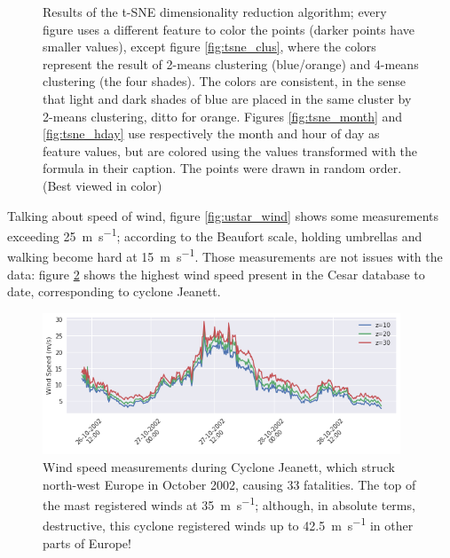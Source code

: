\documentclass[a4paper]{book}
\begin{document}
\begin{figure}
    \caption{Results of the t-SNE dimensionality reduction algorithm; every figure uses a different feature to color the points (darker points have smaller values), except figure \ref{fig:tsne_clus}, where the colors represent the result of 2-means clustering (blue/orange) and 4-means clustering (the four shades). The colors are consistent, in the sense that light and dark shades of blue are placed in the same cluster by 2-means clustering, ditto for orange. Figures \ref{fig:tsne_month} and \ref{fig:tsne_hday} use respectively the month and hour of day as feature values, but are colored using the values transformed with the formula in their caption. The points were drawn in random order. (Best viewed in color)}
	\label{fig:tsne}
\end{figure}


Talking about speed of wind, figure \ref{fig:ustar_wind} shows some measurements exceeding \SI{25}{\meter\per\second}; according to the Beaufort scale, holding umbrellas and walking become hard at \SI{15}{\meter\per\second}. Those measurements are not issues with the data: figure \ref{fig:cyclone_jeanett} shows the highest wind speed present in the Cesar database to date, corresponding to cyclone Jeanett.

\begin{figure}
    \centering
	\includegraphics[width=0.95\textwidth]{images/cyclone_jeanett}
	\caption{Wind speed measurements during Cyclone Jeanett, which struck north-west Europe in October 2002, causing 33 fatalities. The top of the mast registered winds at \SI{35}{\meter\per\second}; although, in absolute terms, destructive, this cyclone registered winds up to \SI{42.5}{\meter\per\second} in other parts of Europe!}
	\label{fig:cyclone_jeanett}
\end{figure}
\end{document}
